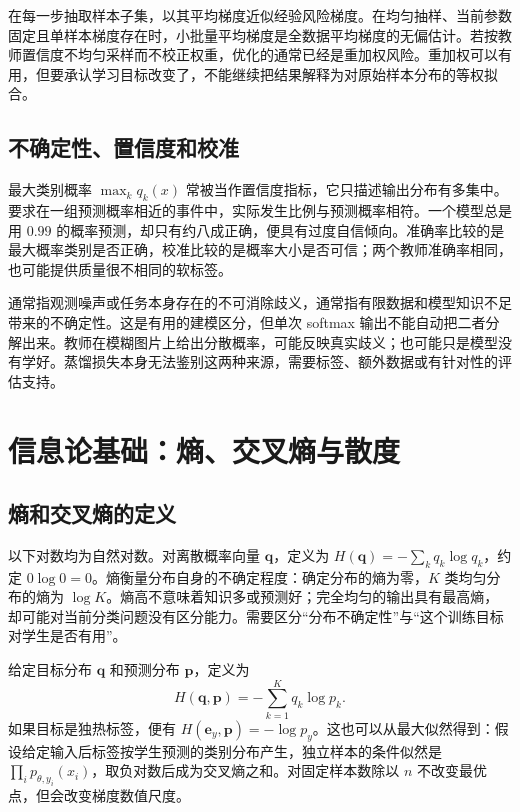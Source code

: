 \documentclass[UTF8,12pt,a4paper,fontset=fandol]{ctexart}
\begin{document}
在每一步抽取样本子集，以其平均梯度近似经验风险梯度。在均匀抽样、当前参数固定且单样本梯度存在时，小批量平均梯度是全数据平均梯度的无偏估计。若按教师置信度不均匀采样而不校正权重，优化的通常已经是重加权风险。重加权可以有用，但要承认学习目标改变了，不能继续把结果解释为对原始样本分布的等权拟合。

\subsection{不确定性、置信度和校准}
最大类别概率 $\max_kq_k(x)$ 常被当作置信度指标，它只描述输出分布有多集中。要求在一组预测概率相近的事件中，实际发生比例与预测概率相符。一个模型总是用 $0.99$ 的概率预测，却只有约八成正确，便具有过度自信倾向。准确率比较的是最大概率类别是否正确，校准比较的是概率大小是否可信；两个教师准确率相同，也可能提供质量很不相同的软标签。

通常指观测噪声或任务本身存在的不可消除歧义，通常指有限数据和模型知识不足带来的不确定性。这是有用的建模区分，但单次 softmax 输出不能自动把二者分解出来。教师在模糊图片上给出分散概率，可能反映真实歧义；也可能只是模型没有学好。蒸馏损失本身无法鉴别这两种来源，需要标签、额外数据或有针对性的评估支持。

\section{信息论基础：熵、交叉熵与散度}
\label{sec:kd-information}

\subsection{熵和交叉熵的定义}
以下对数均为自然对数。对离散概率向量 $\mathbf q$，定义为 $H(\mathbf q)=-\sum_kq_k\log q_k$，约定 $0\log0=0$。熵衡量分布自身的不确定程度：确定分布的熵为零，$K$ 类均匀分布的熵为 $\log K$。熵高不意味着知识多或预测好；完全均匀的输出具有最高熵，却可能对当前分类问题没有区分能力。需要区分“分布不确定性”与“这个训练目标对学生是否有用”。

给定目标分布 $\mathbf q$ 和预测分布 $\mathbf p$，定义为
\begin{equation}
 H(\mathbf q,\mathbf p)=-\sum_{k=1}^Kq_k\log p_k.
 \label{eq:kd-crossentropy}
\end{equation}
如果目标是独热标签，便有 $H(\mathbf e_y,\mathbf p)=-\log p_y$。这也可以从最大似然得到：假设给定输入后标签按学生预测的类别分布产生，独立样本的条件似然是 $\prod_i p_{\theta,y_i}(x_i)$，取负对数后成为交叉熵之和。对固定样本数除以 $n$ 不改变最优点，但会改变梯度数值尺度。
\end{document}
